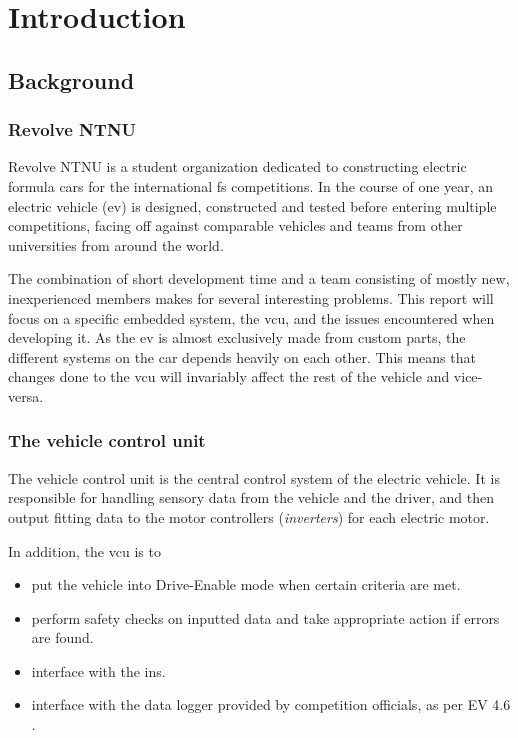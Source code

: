 \section{Introduction}

\subsection{Background}

\subsubsection{Revolve NTNU}

Revolve NTNU is a student organization dedicated to constructing electric formula cars for the international \acrfull{fs} competitions. In the course of one year, an electric vehicle (\acrshort{ev}) is designed, constructed and tested before entering multiple competitions, facing off against comparable vehicles and teams from other universities from around the world.

The combination of short development time and a team consisting of mostly new, inexperienced members makes for several interesting problems. This report will focus on a specific embedded system, the \acrfull{vcu}, and the issues encountered when developing it. As the \acrshort{ev} is almost exclusively made from custom parts, the different systems on the car depends heavily on each other. This means that changes done to the \acrshort{vcu} will invariably affect the rest of the vehicle and vice-versa. 


\subsubsection{The vehicle control unit}

The vehicle control unit is the central control system of the electric vehicle. It is responsible for handling sensory data from the vehicle and the driver, and then output fitting data to the motor controllers (\emph{inverters}) for each electric motor.

In addition, the \acrshort{vcu} is to
\begin{itemize}
    \item put the vehicle into Drive-Enable mode when certain criteria are met.
    \item perform safety checks on inputted data and take appropriate action if errors are found.
    \item interface with the \acrfull{ins}.
    \item interface with the data logger provided by competition officials, as per EV 4.6 \cite{fsgrules}.
\end{itemize}

